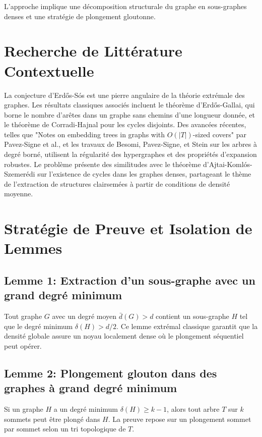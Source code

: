 \documentclass[11pt,a4paper]{article}
\begin{document}
L'approche implique une d\'ecomposition structurale du graphe en sous-graphes denses et une strat\'egie de plongement gloutonne.

\section{Recherche de Litt\'erature Contextuelle}

La conjecture d'Erd\H{o}s-S\'os est une pierre angulaire de la th\'eorie extr\'emale des graphes. Les r\'esultats classiques associ\'es incluent le th\'eor\`eme d'Erd\H{o}s-Gallai, qui borne le nombre d'ar\^etes dans un graphe sans chemins d'une longueur donn\'ee, et le th\'eor\`eme de Corradi-Hajnal pour les cycles disjoints. Des avanc\'ees r\'ecentes, telles que "Notes on embedding trees in graphs with $O(|T|)$-sized covers" par Pavez-Signe et al., et les travaux de Besomi, Pavez-Signe, et Stein sur les arbres \`a degr\'e born\'e, utilisent la r\'egularit\'e des hypergraphes et des propri\'et\'es d'expansion robustes. Le probl\`eme pr\'esente des similitudes avec le th\'eor\`eme d'Ajtai-Koml\'os-Szemer\'edi sur l'existence de cycles dans les graphes denses, partageant le th\`eme de l'extraction de structures clairsem\'ees \`a partir de conditions de densit\'e moyenne.

\section{Strat\'egie de Preuve et Isolation de Lemmes}

\subsection{Lemme 1: Extraction d'un sous-graphe avec un grand degr\'e minimum}
Tout graphe $G$ avec un degr\'e moyen $\bar{d}(G) > d$ contient un sous-graphe $H$ tel que le degr\'e minimum $\delta(H) > d/2$. Ce lemme extr\'emal classique garantit que la densit\'e globale assure un noyau localement dense o\`u le plongement s\'equentiel peut op\'erer.

\subsection{Lemme 2: Plongement glouton dans des graphes \`a grand degr\'e minimum}
Si un graphe $H$ a un degr\'e minimum $\delta(H) \geq k-1$, alors tout arbre $T$ sur $k$ sommets peut \^etre plong\'e dans $H$. La preuve repose sur un plongement sommet par sommet selon un tri topologique de $T$.
\end{document}
